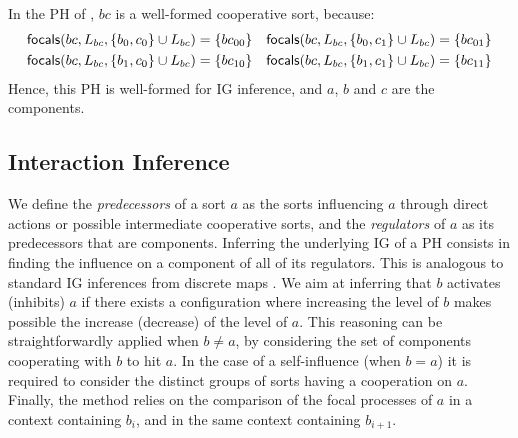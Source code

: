\begin{example*}
In the PH of , $bc$ is a well-formed cooperative sort, %
because:
\begin{align*}
\mathsf{focals}(bc, L_{bc}, \{b_0, c_0\} \cup L_{bc}) = \{bc_{00}\} && \mathsf{focals}(bc, L_{bc}, \{b_0, c_1\} \cup L_{bc}) = \{bc_{01}\} \\
\mathsf{focals}(bc, L_{bc}, \{b_1, c_0\} \cup L_{bc}) = \{bc_{10}\} && \mathsf{focals}(bc, L_{bc}, \{b_1, c_1\} \cup L_{bc}) = \{bc_{11}\}
\end{align*}
Hence, this PH is well-formed for IG inference, and $a$, $b$ and $c$ are the components.
\end{example*}



\subsection{Interaction Inference}\label{ssec:infer-IG}

We define the \emph{predecessors} of a sort $a$ as the sorts influencing $a$ through direct actions or possible intermediate cooperative sorts,
and the \emph{regulators} of $a$ as its predecessors that are components.
Inferring the underlying IG of a PH consists in finding the influence on a component of all of its regulators.
This is analogous to standard IG inferences from discrete maps \cite{RiCo07}.
We aim at inferring that $b$ activates (inhibits) $a$ if there exists a configuration where increasing the level of $b$ makes possible the increase (decrease) of the level of $a$.
This reasoning can be straightforwardly applied %
when $b\neq a$, %
by considering the set of components cooperating with $b$ to hit $a$. %
In the case of a self-influence (when $b = a$) it is required to consider the distinct groups of sorts having a cooperation on $a$.
Finally, the method relies on the comparison of the focal processes of $a$ in a context containing $b_i$, and in the same context containing $b_{i+1}$.

